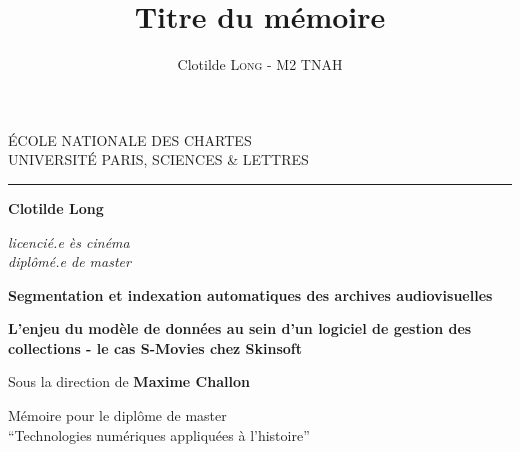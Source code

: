 \documentclass[12pt,twoside]{book}
\author{Clotilde \textsc{Long} - M2 TNAH}
\title{Titre du mémoire}
\begin{document}
	\begin{titlepage}
		\begin{center}
			
			\bigskip
			
			\begin{large}				
				ÉCOLE NATIONALE DES CHARTES\\
				UNIVERSITÉ PARIS, SCIENCES \& LETTRES
			\end{large}
			\begin{center}\rule{2cm}{0.02cm}\end{center}
			
			\bigskip
			\bigskip
			\bigskip
			\begin{Large}
				\textbf{Clotilde Long}\\
			\end{Large}
			\begin{normalsize} \textit{licencié.e ès cinéma}\\
				\textit{diplômé.e de master}
			\end{normalsize}
			
			\bigskip
			\bigskip
			\bigskip
			
			\begin{Huge}
				\textbf{Segmentation et indexation automatiques des archives audiovisuelles}\\
			\end{Huge}
			\bigskip
			\bigskip
			\begin{LARGE}
				\textbf{L'enjeu du modèle de données au sein d'un logiciel de gestion des collections - le cas S-Movies chez Skinsoft}\\
			\end{LARGE}
			
			\bigskip
			\bigskip
			\bigskip
			\begin{large}
				Sous la direction de \textbf{Maxime Challon}
			\end{large}
			\vfill
			
			\begin{large}
				Mémoire 
				pour le diplôme de master \\
				\enquote{Technologies numériques appliquées à l'histoire} \\
			\end{large}
			
		\end{center}
	\end{titlepage}

	\thispagestyle{empty}	
	\cleardoublepage
	
\end{document}
